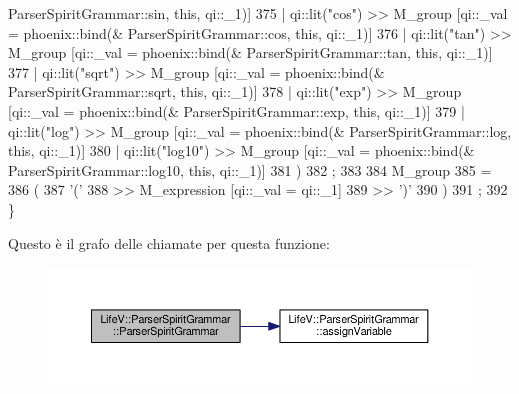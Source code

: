 \begin{DoxyCode}
      ParserSpiritGrammar::sin, \textcolor{keyword}{this},   qi::\_1)]
375         |   qi::lit(\textcolor{stringliteral}{"cos"})   >> M\_group                  [qi::\_val = phoenix::bind(&
      ParserSpiritGrammar::cos, \textcolor{keyword}{this},   qi::\_1)]
376         |   qi::lit(\textcolor{stringliteral}{"tan"})   >> M\_group                  [qi::\_val = phoenix::bind(&
      ParserSpiritGrammar::tan, \textcolor{keyword}{this},   qi::\_1)]
377         |   qi::lit(\textcolor{stringliteral}{"sqrt"})  >> M\_group                  [qi::\_val = phoenix::bind(&
      ParserSpiritGrammar::sqrt, \textcolor{keyword}{this},  qi::\_1)]
378         |   qi::lit(\textcolor{stringliteral}{"exp"})   >> M\_group                  [qi::\_val = phoenix::bind(&
      ParserSpiritGrammar::exp, \textcolor{keyword}{this},   qi::\_1)]
379         |   qi::lit(\textcolor{stringliteral}{"log"})   >> M\_group                  [qi::\_val = phoenix::bind(&
      ParserSpiritGrammar::log, \textcolor{keyword}{this},   qi::\_1)]
380         |   qi::lit(\textcolor{stringliteral}{"log10"}) >> M\_group                  [qi::\_val = phoenix::bind(&
      ParserSpiritGrammar::log10, \textcolor{keyword}{this}, qi::\_1)]
381         )
382         ;
383 
384     M\_group
385     =
386         (
387             \textcolor{charliteral}{'('}
388         >>  M\_expression                                 [qi::\_val = qi::\_1]
389         >>  \textcolor{charliteral}{')'}
390         )
391         ;
392 \}
\end{DoxyCode}


Questo è il grafo delle chiamate per questa funzione\-:
\nopagebreak
\begin{figure}[H]
\begin{center}
\leavevmode
\includegraphics[width=350pt]{classLifeV_1_1ParserSpiritGrammar_afd12d0ca36622930f0c5e574c96acaa7_cgraph}
\end{center}
\end{figure}


